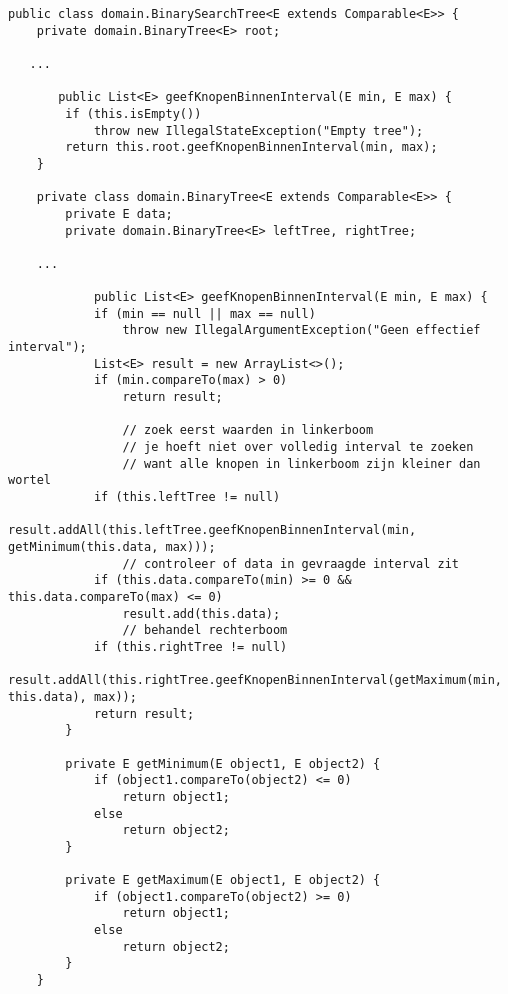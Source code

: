 \begin{oef}
\begin{opl}
\begin{lstlisting}
public class domain.BinarySearchTree<E extends Comparable<E>> {
    private domain.BinaryTree<E> root;

   ...
   
       public List<E> geefKnopenBinnenInterval(E min, E max) {
        if (this.isEmpty())
            throw new IllegalStateException("Empty tree");
        return this.root.geefKnopenBinnenInterval(min, max);
    }

    private class domain.BinaryTree<E extends Comparable<E>> {
        private E data;
        private domain.BinaryTree<E> leftTree, rightTree;

	...
	
	        public List<E> geefKnopenBinnenInterval(E min, E max) {
            if (min == null || max == null)
                throw new IllegalArgumentException("Geen effectief interval");
            List<E> result = new ArrayList<>();
            if (min.compareTo(max) > 0)
                return result;
                
                // zoek eerst waarden in linkerboom
                // je hoeft niet over volledig interval te zoeken 
                // want alle knopen in linkerboom zijn kleiner dan wortel
            if (this.leftTree != null)
                result.addAll(this.leftTree.geefKnopenBinnenInterval(min, getMinimum(this.data, max)));
                // controleer of data in gevraagde interval zit
            if (this.data.compareTo(min) >= 0 && this.data.compareTo(max) <= 0)
                result.add(this.data);
                // behandel rechterboom
            if (this.rightTree != null)
                result.addAll(this.rightTree.geefKnopenBinnenInterval(getMaximum(min, this.data), max));
            return result;
        }

        private E getMinimum(E object1, E object2) {
            if (object1.compareTo(object2) <= 0)
                return object1;
            else
                return object2;
        }

        private E getMaximum(E object1, E object2) {
            if (object1.compareTo(object2) >= 0)
                return object1;
            else
                return object2;
        }
    }
\end{lstlisting}
\end{opl}
\end{oef}


